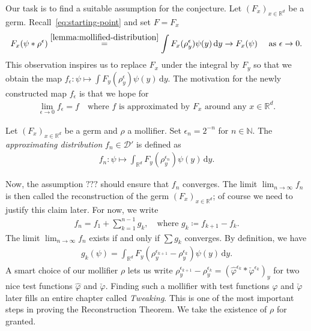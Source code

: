 Our task is to find a suitable assumption for the conjecture. Let \({(F_x)}_{x \in \mathbb{R}^d}\) be a germ. Recall~\eqref{eq:starting-point} and set \( F = F_x \)
\begin{align*}
    F_x(\psi * \rho^\epsilon) \overset{\eqref{lemma:mollified-distribution}}{=} \int F_x(\rho_y^\epsilon) \psi(y)\, \mathrm{d}y \to F_x(\psi) \quad \text{ as } \epsilon \to 0.
\end{align*}
This observation inspires us to replace \(F_x\) under the integral by \(F_y\) so that we obtain the map \(f_\epsilon: \psi \mapsto \int F_y(\rho_y^\epsilon) \psi(y)\, \mathrm{d}y\). The motivation for the newly constructed map \(f_{\epsilon}\) is that we hope for 
\begin{align*}
    \lim_{\epsilon \to 0}f_\epsilon = f \quad \text{where } f \text{ is approximated by \(F_x\) around any \(x \in \mathbb{R}^d\)}.
\end{align*}
\begin{definition}\label{def:approximating-distributions}
        Let \({(F_x)}_{x \in \mathbb{R}^d}\) be a germ and \( \rho \) a mollifier. Set \(\epsilon_n = 2^{-n}\) for \(n \in \mathbb{N}\). The \emph{approximating distribution} \(f_n \in \mathcal{D}'\) is defined as 
        \begin{align*}
                f_n: \psi \mapsto \int_{\mathbb{R}^d} F_y(\rho_y^{\epsilon_n}) \psi(y)\, \mathrm{d}y.
        \end{align*}
\end{definition}
Now, the assumption \(\texttt{???}\) should ensure that \(f_n\) converges. The limit \( \lim_{n \to \infty} f_n \) is then called the reconstruction of the germ \( (F_x)_{x \in \mathbb{R}^d} \); of course we need to justify this claim later. For now, we write 
\begin{align*}
    f_n = f_1 + \sum^{n-1}_{k=1}g_k, \quad \text{where } g_k \coloneqq f_{k+1} - f_k.
\end{align*}
The limit \(\lim_{n \to \infty} f_n\) exists if and only if \(\sum g_k\) converges. By definition, we have
\begin{align*}
        g_k(\psi) = \int_{\mathbb{R}^d} F_y(\rho_y^{\epsilon_{k+1}} - \rho_y^{\epsilon_k}) \psi(y)\, \mathrm{d}y.
\end{align*}
A smart choice of our mollifier \( \rho \) lets us write \( \rho^{\epsilon_{k+1}}_y - \rho^{\epsilon_k}_y = {(\hat \varphi^{\epsilon_k} * \check \varphi^{\epsilon_k})}_y\) for two nice test functions \( \hat \varphi \) and \( \check \varphi \). Finding such a mollifier with test functions \( \hat \varphi \) and \( \check \varphi \) later fills an entire chapter called \emph{Tweaking}. This is one of the most important steps in proving the Reconstruction Theorem. We take the existence of \( \rho \) for granted.
